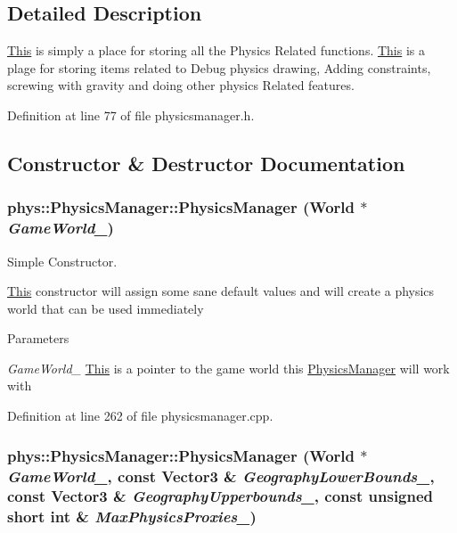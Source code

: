 \subsection{Detailed Description}
\hyperlink{structThis}{This} is simply a place for storing all the Physics Related functions. \hyperlink{structThis}{This} is a plage for storing items related to Debug physics drawing, Adding constraints, screwing with gravity and doing other physics Related features. 

Definition at line 77 of file physicsmanager.h.



\subsection{Constructor \& Destructor Documentation}
\hypertarget{classphys_1_1PhysicsManager_a3c78a0773d6a544aa6ea06b12ffc5fee}{
\subsubsection[{PhysicsManager}]{\setlength{\rightskip}{0pt plus 5cm}phys::PhysicsManager::PhysicsManager ({\bf World} $\ast$ {\em GameWorld\_\-})}}
\label{d3/dcc/classphys_1_1PhysicsManager_a3c78a0773d6a544aa6ea06b12ffc5fee}


Simple Constructor. 

\hyperlink{structThis}{This} constructor will assign some sane default values and will create a physics world that can be used immediately 
\begin{DoxyParams}{Parameters}
\item[{\em GameWorld\_\-}]\hyperlink{structThis}{This} is a pointer to the game world this \hyperlink{classphys_1_1PhysicsManager}{PhysicsManager} will work with \end{DoxyParams}


Definition at line 262 of file physicsmanager.cpp.

\hypertarget{classphys_1_1PhysicsManager_aa2c37564d35c3b7266219812ee43717f}{
\subsubsection[{PhysicsManager}]{\setlength{\rightskip}{0pt plus 5cm}phys::PhysicsManager::PhysicsManager ({\bf World} $\ast$ {\em GameWorld\_\-}, \/  const {\bf Vector3} \& {\em GeographyLowerBounds\_\-}, \/  const {\bf Vector3} \& {\em GeographyUpperbounds\_\-}, \/  const unsigned short int \& {\em MaxPhysicsProxies\_\-})}}
\label{d3/dcc/classphys_1_1PhysicsManager_aa2c37564d35c3b7266219812ee43717f}


